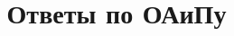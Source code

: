 \documentclass[12pt, a4paper]{extarticle}
\begin{document}
\title{Ответы по ОАиПу}
\clearpage\maketitle
\thispagestyle{empty}

\newpage
\tableofcontents
\newpage




\setcounter{section}{36}


% 
\end{document}
